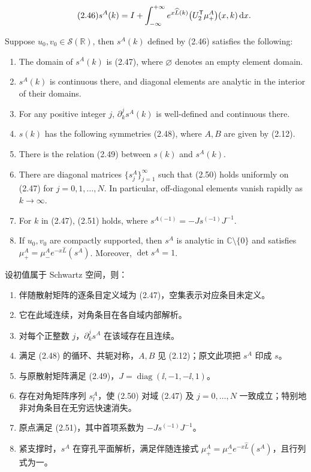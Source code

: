 \begin{equation}
\originaleq{2.46}
s^A(k)=I+\int_{-\infty}^{+\infty}
e^{x\widehat L(k)}\bigl(U_2^{\mathsf T}\mu_+^A\bigr)(x,k)\dd x.
\end{equation}
\begin{paperpropositionen}\label{prop:2.8}
Suppose $u_0,v_0\in\mathcal S(\mathbb R)$, then $s^A(k)$ defined by (2.46) satisfies the following:
\begin{enumerate}[label=\alph*.]
\item The domain of $s^A(k)$ is (2.47), where $\varnothing$ denotes an empty element domain.
\item $s^A(k)$ is continuous there, and diagonal elements are analytic in the interior of their domains.
\item For any positive integer $j$, $\partial_k^j s^A(k)$ is well-defined and continuous there.
\item $s(k)$ has the following symmetries (2.48), where $A,B$ are given by (2.12).
\item There is the relation (2.49) between $s(k)$ and $s^A(k)$.
\item There are diagonal matrices $\{s_j^A\}_{j=1}^\infty$ such that (2.50) holds uniformly on (2.47) for $j=0,1,\ldots,N$. In particular, off-diagonal elements vanish rapidly as $k\to\infty$.
\item For $k$ in (2.47), (2.51) holds, where $s^{A(-1)}=-Js^{(-1)}J^{-1}$.
\item If $u_0,v_0$ are compactly supported, then $s^A$ is analytic in $\mathbb C\setminus\{0\}$ and satisfies $\mu_+^A=\mu_-^Ae^{-x\widehat L}(s^A)$. Moreover, $\det s^A=1$.
\end{enumerate}
\end{paperpropositionen}
\begin{paperpropositioncn*}
设初值属于 Schwartz 空间，则：
\begin{enumerate}[label=\alph*.]
\item 伴随散射矩阵的逐条目定义域为 (2.47)，空集表示对应条目未定义。
\item 它在此域连续，对角条目在各自域内部解析。
\item 对每个正整数 $j$，$\partial_k^j s^A$ 在该域存在且连续。
\item 满足 (2.48) 的循环、共轭对称，$A,B$ 见 (2.12)；原文此项把 $s^A$ 印成 $s$。
\item 与原散射矩阵满足 (2.49)，$J=\operatorname{diag}(\ii,-1,-\ii,1)$。
\item 存在对角矩阵序列 $s_l^A$，使 (2.50) 对域 (2.47) 及 $j=0,\ldots,N$ 一致成立；特别地非对角条目在无穷远快速消失。
\item 原点满足 (2.51)，其中首项系数为 $-Js^{(-1)}J^{-1}$。
\item 紧支撑时，$s^A$ 在穿孔平面解析，满足伴随连接式 $\mu_+^A=\mu_-^Ae^{-x\widehat L}(s^A)$，且行列式为一。
\end{enumerate}
\end{paperpropositioncn*}
